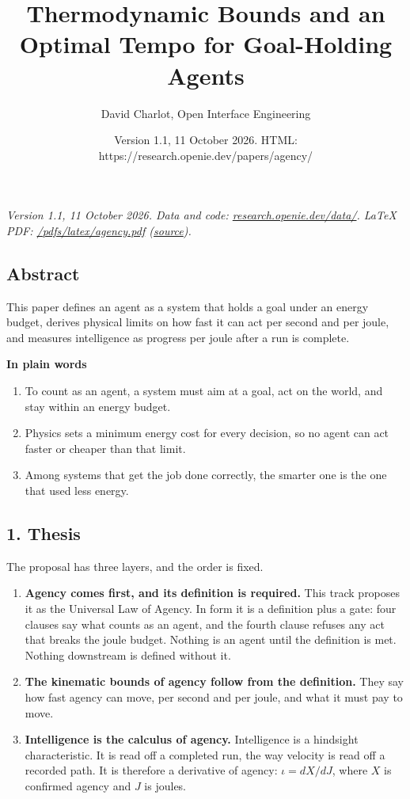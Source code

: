 \documentclass[
  10pt,
]{article}
\title{Thermodynamic Bounds and an Optimal Tempo for Goal-Holding
Agents}
\author{David Charlot, Open Interface Engineering}
\date{Version 1.1, 11 October 2026. HTML:
https://research.openie.dev/papers/agency/}
\providecommand{\tightlist}{%
  \setlength{\itemsep}{0pt}\setlength{\parskip}{0pt}}
\begin{document}
\maketitle

{
\setcounter{tocdepth}{2}
\tableofcontents
}
\emph{Version 1.1, 11 October 2026. Data and code:
\href{https://research.openie.dev/data/\#agency}{research.openie.dev/data/}.
LaTeX PDF:
\href{https://research.openie.dev/pdfs/latex/agency.pdf}{/pdfs/latex/agency.pdf}
(\href{https://research.openie.dev/pdfs/latex/agency.tex}{source}).}

\subsection{Abstract}\label{abstract}

This paper defines an agent as a system that holds a goal under an
energy budget, derives physical limits on how fast it can act per second
and per joule, and measures intelligence as progress per joule after a
run is complete.

\textbf{In plain words}

\begin{enumerate}
\def\labelenumi{\arabic{enumi}.}
\tightlist
\item
  To count as an agent, a system must aim at a goal, act on the world,
  and stay within an energy budget.
\item
  Physics sets a minimum energy cost for every decision, so no agent can
  act faster or cheaper than that limit.
\item
  Among systems that get the job done correctly, the smarter one is the
  one that used less energy.
\end{enumerate}

\subsection{1. Thesis}\label{thesis}

The proposal has three layers, and the order is fixed.

\begin{enumerate}
\def\labelenumi{\arabic{enumi}.}
\tightlist
\item
  \textbf{Agency comes first, and its definition is required.} This
  track proposes it as the Universal Law of Agency. In form it is a
  definition plus a gate: four clauses say what counts as an agent, and
  the fourth clause refuses any act that breaks the joule budget.
  Nothing is an agent until the definition is met. Nothing downstream is
  defined without it.
\item
  \textbf{The kinematic bounds of agency follow from the definition.}
  They say how fast agency can move, per second and per joule, and what
  it must pay to move.
\item
  \textbf{Intelligence is the calculus of agency.} Intelligence is a
  hindsight characteristic. It is read off a completed run, the way
  velocity is read off a recorded path. It is therefore a derivative of
  agency: \(\iota = dX/dJ\), where \(X\) is confirmed agency and \(J\)
  is joules.
\end{enumerate}
\end{document}
